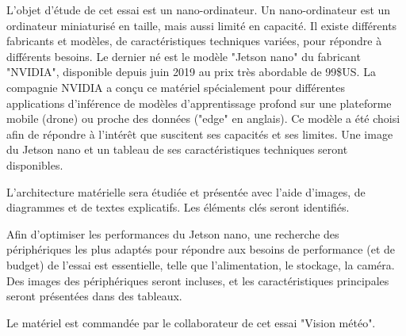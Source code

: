 \par L'objet d'étude de cet essai est un nano-ordinateur. Un nano-ordinateur est un ordinateur miniaturisé en taille, mais aussi limité en capacité. Il existe différents fabricants et modèles, de caractéristiques techniques variées, pour répondre à différents besoins. Le dernier né est le modèle "Jetson nano" du fabricant "NVIDIA", disponible depuis juin 2019 au prix très abordable de 99\$US. La compagnie NVIDIA a conçu ce matériel spécialement pour différentes applications d'inférence de modèles d'apprentissage profond sur une plateforme mobile (drone) ou proche des données ("edge" en anglais). Ce modèle a été choisi afin de répondre à l'intérêt que suscitent ses capacités et ses limites. Une image du Jetson nano et un tableau de ses caractéristiques techniques seront disponibles. 
\par L'architecture matérielle sera étudiée et présentée avec l'aide d'images, de diagrammes et de textes explicatifs. Les éléments clés seront identifiés.
\par Afin d'optimiser les performances du Jetson nano, une recherche des périphériques les plus adaptés pour répondre aux besoins de performance (et de budget) de l'essai est essentielle, telle que l'alimentation, le stockage, la caméra. Des images des périphériques seront incluses, et les caractéristiques principales seront présentées dans des tableaux.
\par Le matériel est commandée par le collaborateur de cet essai "Vision météo".
\vspace{1\baselineskip}
\par 
